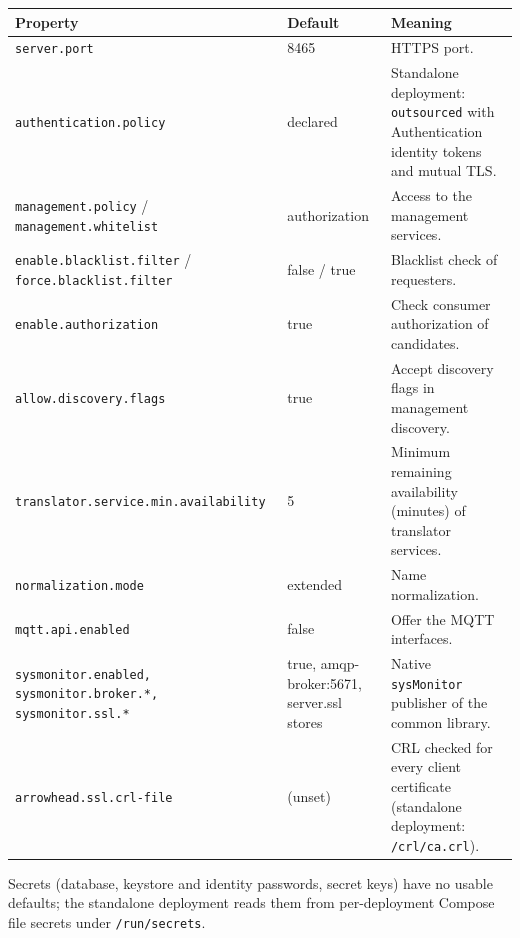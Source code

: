\documentclass[a4paper]{arrowhead}
\begin{document}
\noindent\begin{longtable}{| p{5.4cm} | p{3.4cm} | p{6.4cm} |} \hline
\rowcolor{gray!33} Property & Default & Meaning \\ \hline \endhead
\texttt{server.\allowbreak{}port} & 8465 & HTTPS port. \\ \hline
\texttt{authentication.\allowbreak{}policy} & declared & Standalone deployment: \texttt{outsourced} with Authentication identity tokens and mutual TLS. \\ \hline
\texttt{management.\allowbreak{}policy} / \texttt{management.\allowbreak{}whitelist} & authorization & Access to the management services. \\ \hline
\texttt{enable.\allowbreak{}blacklist.\allowbreak{}filter} / \texttt{force.\allowbreak{}blacklist.\allowbreak{}filter} & false / true & Blacklist check of requesters. \\ \hline
\texttt{enable.\allowbreak{}authorization} & true & Check consumer authorization of candidates. \\ \hline
\texttt{allow.\allowbreak{}discovery.\allowbreak{}flags} & true & Accept discovery flags in management discovery. \\ \hline
\texttt{translator.\allowbreak{}service.\allowbreak{}min.\allowbreak{}availability} & 5 & Minimum remaining availability (minutes) of translator services. \\ \hline
\texttt{normalization.\allowbreak{}mode} & extended & Name normalization. \\ \hline
\texttt{mqtt.\allowbreak{}api.\allowbreak{}enabled} & false & Offer the MQTT interfaces. \\ \hline
\texttt{sysmonitor.\allowbreak{}enabled,\allowbreak{} sysmonitor.\allowbreak{}broker.\allowbreak{}*,\allowbreak{} sysmonitor.\allowbreak{}ssl.\allowbreak{}*} & true, amqp-broker:5671, server.ssl stores & Native \texttt{sysMonitor} publisher of the common library. \\ \hline
\texttt{arrowhead.\allowbreak{}ssl.\allowbreak{}crl-\allowbreak{}file} & (unset) & CRL checked for every client certificate (standalone deployment: \texttt{/\allowbreak{}crl/\allowbreak{}ca.\allowbreak{}crl}). \\ \hline
\end{longtable}

Secrets (database, keystore and identity passwords, secret keys) have no usable defaults; the standalone deployment reads them from per-deployment Compose file secrets under \texttt{/\allowbreak{}run/\allowbreak{}secrets}.
\end{document}
